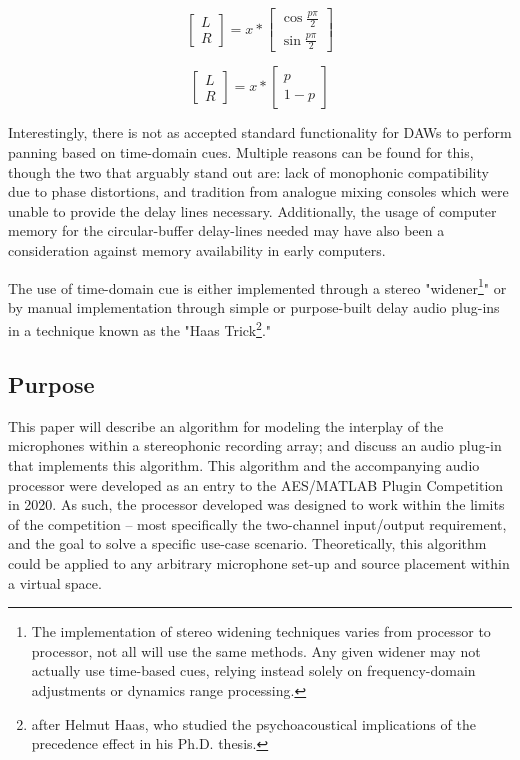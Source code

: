\begin{equation} \label{threedB}
\begin{bmatrix}L \\ R \end{bmatrix} = x * \begin{bmatrix} \cos{\frac{p\pi}{2}} \\ \sin{\frac{p\pi}{2}} \end{bmatrix}
\end{equation}

\begin{equation}\label{sixdB}
\begin{bmatrix}L \\ R \end{bmatrix} = x * \begin{bmatrix} p \\ 1 - p \end{bmatrix}
\end{equation}

Interestingly, there is not as accepted standard functionality for DAWs to perform panning based on time-domain cues. Multiple reasons can be found for this, though the two that arguably stand out are: lack of monophonic compatibility due to phase distortions, and tradition from analogue mixing consoles which were unable to provide the delay lines necessary. Additionally, the usage of computer memory for the circular-buffer delay-lines needed may have also been a consideration against memory availability in early computers.

The use of time-domain cue is either implemented through a stereo "widener\footnote{The implementation of stereo widening techniques varies from processor to processor, not all will use the same methods. Any given widener may not actually use time-based cues, relying instead solely on frequency-domain adjustments or dynamics range processing.}" or by manual implementation through simple or purpose-built delay audio plug-ins in a technique known as the "Haas Trick\footnote{after Helmut Haas, who studied the psychoacoustical implications of the precedence effect in his Ph.D. thesis.}."

\subsection{Purpose}

This paper will describe an algorithm for modeling the interplay of the microphones within a stereophonic recording array; and discuss an audio plug-in that implements this algorithm. This algorithm and the accompanying audio processor were developed as an entry to the AES/MATLAB Plugin Competition in 2020. As such, the processor developed was designed to work within the limits of the competition -- most specifically the two-channel input/output requirement, and the goal to solve a specific use-case scenario. Theoretically, this algorithm could be applied to any arbitrary microphone set-up and source placement within a virtual space.

